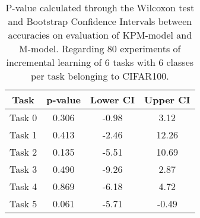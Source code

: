 \begin{table}[H]
\centering
\begin{tabular}{cccc}
\toprule
Task & p-value & Lower CI & Upper CI \\
\midrule
Task 0 & 0.306 &-0.98 & 3.12 \\
Task 1 & 0.413 &-2.46 & 12.26 \\
Task 2 & 0.135 &-5.51 & 10.69 \\
Task 3 & 0.490 &-9.26 & 2.87 \\
Task 4 & 0.869 &-6.18 & 4.72 \\
Task 5 & 0.061 &-5.71 & -0.49 \\
\bottomrule
\end{tabular}
\caption{P-value calculated through the Wilcoxon test and Bootstrap Confidence Intervals between accuracies on evaluation of KPM-model and M-model. Regarding 80 experiments of incremental learning of 6 tasks with 6 classes per task belonging to CIFAR100.}
\end{table}
